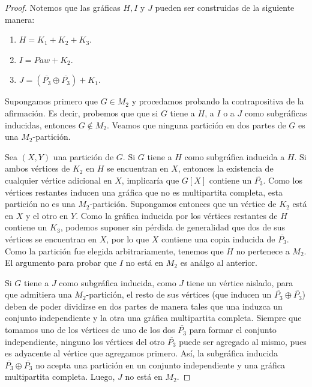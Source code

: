 \begin{proof}

  Notemos que las gráficas $H, I$ y $J$ pueden ser construidas de la siguiente manera:

  \begin{enumerate}[(1)]
      \item $H = K_1 + K_2 + K_3$.
      \item $I = Paw + K_2$.
      \item $J = (\overline{P_3} \oplus \overline{P_3}) + K_1$.
  \end{enumerate}

  Supongamos primero que $G \in M_2$ y procedamos probando la contrapositiva
  de la afirmación. Es decir, probemos que que si $G$ tiene a $H$, a $I$
  o a $J$ como subgráficas inducidas, entonces $G \notin M_2$.
  Veamos que ninguna partici\'on en dos partes de $G$ es una $M_2$-partici\'on.
  
  Sea $(X,Y)$ una partici\'on de $G$. Si $G$ tiene a $H$ como subgráfica inducida a $H$. Si ambos vértices de $K_2$ en $H$
  se encuentran en $X$, entonces la existencia de cualquier vértice adicional
  en $X$, implicar\'ia que $G[X]$ contiene un $\overline{P_3}$. Como los
  vértices restantes inducen una gráfica que no es multipartita completa,
  esta partici\'on no es una $M_2$-partici\'on. Supongamos entonces que un
  v\'ertice de $K_2$ est\'a en $X$ y el otro en $Y$. Como la gráfica inducida
  por los vértices restantes de $H$ contiene un $K_3$, podemos suponer sin
  p\'erdida de generalidad que dos de sus v\'ertices se encuentran en $X$,
  por lo que $X$ contiene una copia inducida de $\overline{P_3}$. Como la
  partici\'on fue elegida arbitrariamente, tenemos que $H$ no pertenece a
  $M_2$. El argumento para probar que $I$ no está en $M_2$ es an\'algo al
  anterior.

  Si $G$ tiene a $J$ como subgráfica inducida, como $J$ tiene un vértice aislado, para que admitiera
  una $M_2$-partici\'on, el resto de sus vértices (que inducen un
  $\overline{P_3} \oplus \overline{P_3}$) deben de poder dividirse en dos
  partes de manera tales que una induzca un conjunto independiente y la otra
  una gráfica multipartita completa. Siempre que tomamos uno de los vértices
  de uno de los dos $\overline{P_3}$ para formar el conjunto independiente,
  ninguno los vértices del otro $\overline{P_3}$ puede ser agregado al mismo,
  pues es adyacente al vértice que agregamos primero. Así, la subgráfica
  inducida $\overline{P_3} \oplus \overline{P_3}$ no acepta una partición en
  un conjunto independiente y una gráfica multipartita completa. Luego, $J$
  no está en $M_2$.


\end{proof}

